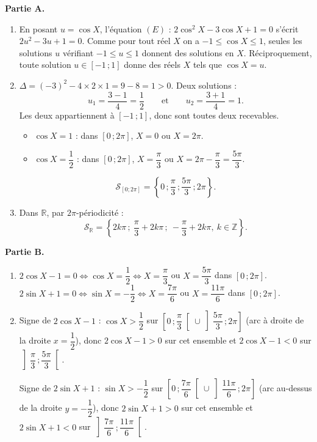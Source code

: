 \documentclass[11pt]{article}
\begin{document}
\begin{corrige}
\textbf{Partie A.}
\begin{enumerate}
\item En posant $u=\cos X$, l'équation $(E)$ : $2\cos^2 X-3\cos X+1=0$ s'écrit $2u^2-3u+1=0$. Comme pour tout réel $X$ on a $-1\leq\cos X\leq 1$, seules les solutions $u$ vérifiant $-1\leq u\leq 1$ donnent des solutions en $X$. Réciproquement, toute solution $u\in[-1\,;1]$ donne des réels $X$ tels que $\cos X=u$.
\item $\Delta=(-3)^2-4\times 2\times 1=9-8=1>0$. Deux solutions :
\[u_1=\dfrac{3-1}{4}=\dfrac{1}{2}\qquad\text{et}\qquad u_2=\dfrac{3+1}{4}=1.\]
Les deux appartiennent à $[-1\,;1]$, donc sont toutes deux recevables.
\begin{itemize}
\item $\cos X=1$ : dans $[0\,;2\pi]$, $X=0$ ou $X=2\pi$.
\item $\cos X=\dfrac{1}{2}$ : dans $[0\,;2\pi]$, $X=\dfrac{\pi}{3}$ ou $X=2\pi-\dfrac{\pi}{3}=\dfrac{5\pi}{3}$.
\end{itemize}
\[\mathcal{S}_{[0;2\pi]}=\left\{0\,;\dfrac{\pi}{3}\,;\dfrac{5\pi}{3}\,;2\pi\right\}.\]
\item Dans $\mathbb{R}$, par $2\pi$-périodicité :
\[\mathcal{S}_{\mathbb{R}}=\left\{2k\pi\,;\ \dfrac{\pi}{3}+2k\pi\,;\ -\dfrac{\pi}{3}+2k\pi,\ k\in\mathbb{Z}\right\}.\]
\end{enumerate}
\textbf{Partie B.}
\begin{enumerate}
\item $2\cos X-1=0\Longleftrightarrow\cos X=\dfrac{1}{2}\Longleftrightarrow X=\dfrac{\pi}{3}$ ou $X=\dfrac{5\pi}{3}$ dans $[0\,;2\pi]$.
$2\sin X+1=0\Longleftrightarrow\sin X=-\dfrac{1}{2}\Longleftrightarrow X=\dfrac{7\pi}{6}$ ou $X=\dfrac{11\pi}{6}$ dans $[0\,;2\pi]$.
\item Signe de $2\cos X-1$ : $\cos X>\dfrac{1}{2}$ sur $\left[0\,;\dfrac{\pi}{3}\right[\cup\left]\dfrac{5\pi}{3}\,;2\pi\right]$ (arc à droite de la droite $x=\dfrac12$), donc $2\cos X-1>0$ sur cet ensemble et $2\cos X-1<0$ sur $\left]\dfrac{\pi}{3}\,;\dfrac{5\pi}{3}\right[$.

Signe de $2\sin X+1$ : $\sin X>-\dfrac{1}{2}$ sur $\left[0\,;\dfrac{7\pi}{6}\right[\cup\left]\dfrac{11\pi}{6}\,;2\pi\right]$ (arc au-dessus de la droite $y=-\dfrac12$), donc $2\sin X+1>0$ sur cet ensemble et $2\sin X+1<0$ sur $\left]\dfrac{7\pi}{6}\,;\dfrac{11\pi}{6}\right[$.


\end{enumerate}
\end{corrige}
\end{document}

